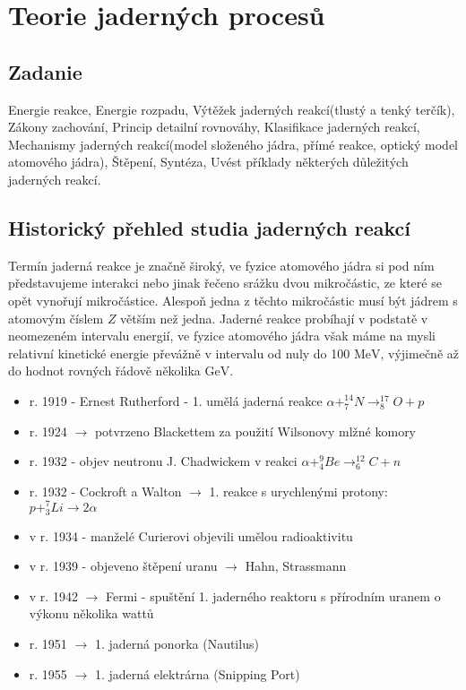 \documentclass[../../main.tex]{subfiles}
\begin{document}
\chapter{Teorie jaderných procesů}

\section{Zadanie}

Energie reakce, Energie rozpadu, Výtěžek jaderných reakcí(tlustý a tenký terčík), Zákony zachování, Princip detailní rovnováhy, Klasifikace jaderných reakcí, Mechanismy jaderných reakcí(model složeného jádra, přímé reakce, optický model atomového jádra), Štěpení, Syntéza, Uvést příklady některých důležitých jaderných reakcí.

\section{Historický přehled studia jaderných reakcí}

Termín jaderná reakce je značně široký, ve fyzice atomového jádra si pod ním představujeme interakci nebo jinak řečeno srážku dvou mikročástic, ze které se opět vynořují mikročástice. Alespoň jedna z těchto mikročástic musí být jádrem s atomovým číslem $Z$ větším než jedna. Jaderné reakce probíhají v podstatě v neomezeném intervalu energií, ve fyzice atomového jádra však máme na mysli relativní kinetické energie převážně v intervalu od nuly do 100 $\mathrm{MeV}$, výjimečně až do hodnot rovných řádově několika $\mathrm{GeV}$. 

\begin{itemize}
	\item r. 1919 - Ernest Rutherford - 1. umělá jaderná reakce $\alpha + ^{14}_{7}N \rightarrow ^{17}_{8}O + p$
	\item r. 1924 $\rightarrow$ potvrzeno Blackettem za použití Wilsonovy mlžné komory
	\item r. 1932 - objev neutronu J. Chadwickem v reakci $\alpha + ^{9}_{4}Be \rightarrow ^{12}_{6}C + n$
	\item r. 1932 - Cockroft a Walton $\rightarrow$ 1. reakce s urychlenými protony: $p + ^{7}_{3}Li \rightarrow 2 \alpha$
	\item v r. 1934 - manželé Curierovi objevili umělou radioaktivitu
	\item v r. 1939 - objeveno štěpení uranu $\rightarrow$ Hahn, Strassmann
	\item v r. 1942 $\rightarrow$ Fermi - spuštění 1. jaderného reaktoru s přírodním uranem o výkonu několika wattů
	\item r. 1951 $\rightarrow$ 1. jaderná ponorka (Nautilus)
	\item r. 1955 $\rightarrow$ 1. jaderná elektrárna (Snipping Port)	
\end{itemize} 
\end{document}
